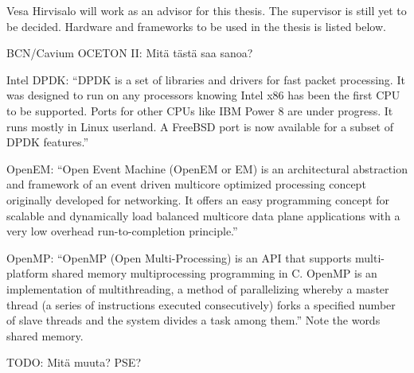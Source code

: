 Vesa Hirvisalo will work as an advisor for this thesis. The supervisor is still yet to be decided. Hardware and frameworks to be used in the thesis is listed below.


BCN/Cavium OCETON II: Mitä tästä saa sanoa?

Intel DPDK: ``DPDK is a set of libraries and drivers for fast packet processing. It was designed to run on any processors knowing Intel x86 has been the first CPU to be supported. Ports for other CPUs like IBM Power 8 are under progress. It runs mostly in Linux userland. A FreeBSD port is now available for a subset of DPDK features.''

OpenEM: ``Open Event Machine (OpenEM or EM) is an architectural abstraction and framework of an event driven multicore optimized processing concept originally developed for networking. It offers an easy programming concept for scalable and dynamically load balanced multicore data plane applications with a very low overhead run-to-completion principle.''

OpenMP: ``OpenMP (Open Multi-Processing) is an API that supports multi-platform shared memory multiprocessing programming in C. OpenMP is an implementation of multithreading, a method of parallelizing whereby a master thread (a series of instructions executed consecutively) forks a specified number of slave threads and the system divides a task among them.'' Note the words shared memory.

TODO: Mitä muuta? PSE?

